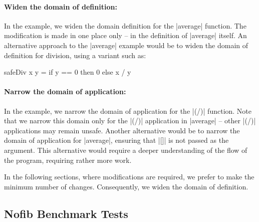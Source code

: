 \paragraph{Widen the domain of definition:} In the example, we widen the domain definition for the |average| function. The modification is made in one place only -- in the definition of |average| itself. An alternative approach to the |average| example would be to widen the domain of definition for division, using a variant such as:

\begin{code}
safeDiv x y = if y == 0 then 0 else x / y
\end{code}


\paragraph{Narrow the domain of application:} In the example, we narrow the domain of application for the |(/)| function.  Note that we narrow this domain only for the |(/)| application in |average| -- other |(/)| applications may remain unsafe. Another alternative would be to narrow the domain of application for |average|, ensuring that |[]| is not passed as the argument. This alternative would require a deeper understanding of the flow of the program, requiring rather more work.

In the following sections, where modifications are required, we prefer to make the minimum number of changes. Consequently, we widen the domain of definition.

\subsection{Nofib Benchmark Tests}
\label{sec:imaginary}

